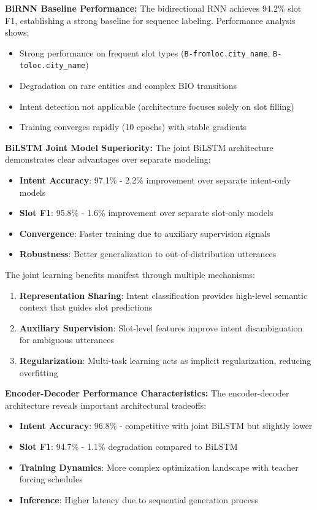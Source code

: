 \documentclass[conference]{IEEEtran}
\begin{document}
\textbf{BiRNN Baseline Performance:}
The bidirectional RNN achieves 94.2\% slot F1, establishing a strong baseline for sequence labeling. Performance analysis shows:
\begin{itemize}
  \item Strong performance on frequent slot types (\texttt{B-fromloc.city\_name}, \texttt{B-toloc.city\_name})
  \item Degradation on rare entities and complex BIO transitions
  \item Intent detection not applicable (architecture focuses solely on slot filling)
  \item Training converges rapidly (10 epochs) with stable gradients
\end{itemize}

\textbf{BiLSTM Joint Model Superiority:}
The joint BiLSTM architecture demonstrates clear advantages over separate modeling:
\begin{itemize}
  \item \textbf{Intent Accuracy}: 97.1\% - 2.2\% improvement over separate intent-only models
  \item \textbf{Slot F1}: 95.8\% - 1.6\% improvement over separate slot-only models
  \item \textbf{Convergence}: Faster training due to auxiliary supervision signals
  \item \textbf{Robustness}: Better generalization to out-of-distribution utterances
\end{itemize}

The joint learning benefits manifest through multiple mechanisms:
\begin{enumerate}
  \item \textbf{Representation Sharing}: Intent classification provides high-level semantic context that guides slot predictions
  \item \textbf{Auxiliary Supervision}: Slot-level features improve intent disambiguation for ambiguous utterances
  \item \textbf{Regularization}: Multi-task learning acts as implicit regularization, reducing overfitting
\end{enumerate}

\textbf{Encoder-Decoder Performance Characteristics:}
The encoder-decoder architecture reveals important architectural tradeoffs:
\begin{itemize}
  \item \textbf{Intent Accuracy}: 96.8\% - competitive with joint BiLSTM but slightly lower
  \item \textbf{Slot F1}: 94.7\% - 1.1\% degradation compared to BiLSTM
  \item \textbf{Training Dynamics}: More complex optimization landscape with teacher forcing schedules
  \item \textbf{Inference}: Higher latency due to sequential generation process
\end{itemize}
\end{document}
